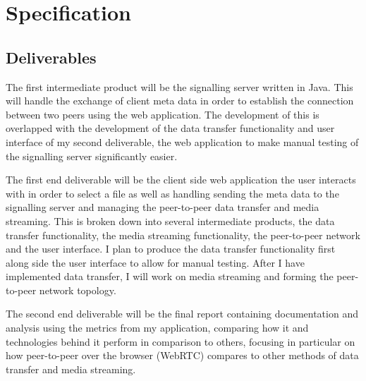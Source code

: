 \documentclass[]{report}
\begin{document}
	\begin{lstlisting}[tabsize=1,frame=single, basicstyle=\ttfamily\footnotesize]

	\end{lstlisting}
				
\chapter{Specification}
	\section{Deliverables}
	The first intermediate product will be the signalling server written in Java. This will handle the exchange of client meta data in order to establish the connection between two peers using the web application. The development of this is overlapped with the development of the data transfer functionality and user interface of my second deliverable, the web application to make manual testing of the signalling server significantly easier.
	
	The first end deliverable will be the client side web application the user interacts with in order to select a file as well as handling sending the meta data to the signalling server and managing the peer-to-peer data transfer and media streaming. This is broken down into several intermediate products, the data transfer functionality, the media streaming functionality, the peer-to-peer network and the user interface. I plan to produce the data transfer functionality first along side the user interface to allow for manual testing. After I have implemented data transfer, I will work on media streaming and forming the peer-to-peer network topology. 
	
	The second end deliverable will be the final report containing documentation and analysis using the metrics from my application, comparing how it and technologies behind it perform in comparison to others, focusing in particular on how peer-to-peer over the browser (WebRTC) compares to other methods of data transfer and media streaming.
	
\end{document}

